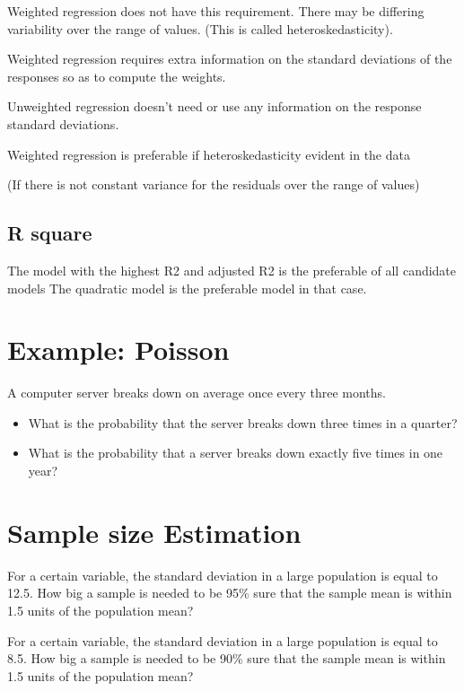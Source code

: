 \documentclass[12pt, a4paper]{report}
\theoremstyle{plain}
\theoremstyle{definition}
\theoremstyle{remark}
\begin{document}
Weighted regression does not have this requirement.
There may be differing variability over the range of values.
(This is called heteroskedasticity).

Weighted regression requires extra information on the standard deviations of the responses so as to compute the weights.

Unweighted regression doesn’t need or use any information on the response standard deviations.

Weighted regression is preferable if heteroskedasticity evident in the data

(If there is not constant variance for the residuals over the range of values)

\subsection{R square}
The model with the highest R2 and adjusted R2  is the preferable of all candidate models
The quadratic model is the preferable model in that case.


\section{Example: Poisson}

A computer server breaks down on average once every three months.

\begin{itemize}
\item What is the probability that the server breaks down three times in a quarter?
\item What is the probability that a server breaks down exactly five times in one year?
\end{itemize}



\section{Sample size Estimation}
For a certain variable, the standard deviation in a large population is equal to 12.5.
How big a sample is needed to be 95\% sure that the sample mean is within 1.5 units of the population mean?


For a certain variable, the standard deviation in a large population is equal to 8.5.
How big a sample is needed to be 90\% sure that the sample mean is within 1.5
units of the population mean?
\end{document}
